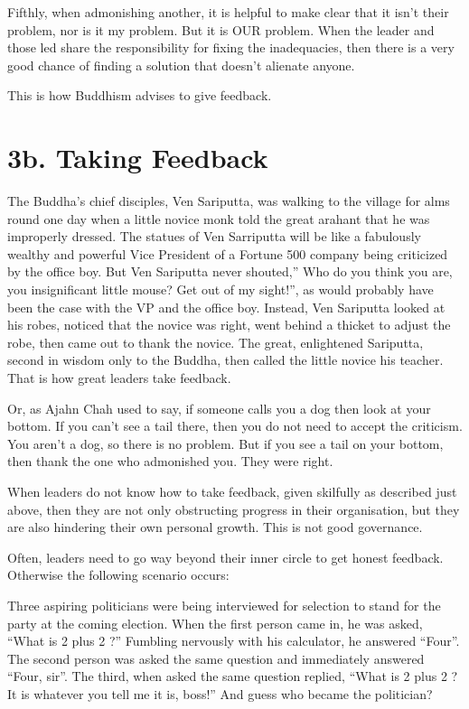\documentclass[12pt, openany]{book}
\begin{document}
Fifthly, when admonishing another, it is helpful to make clear that it isn’t their problem, nor is it my problem. But it is OUR problem. When the leader and those led share the responsibility for fixing the inadequacies, then there is a very good chance of finding a solution that doesn’t alienate anyone.

This is how Buddhism advises to give feedback.

\section{3b. Taking Feedback}

The Buddha’s chief disciples, Ven Sariputta, was walking to the village for alms round one day when a little novice monk told the great arahant that he was improperly dressed. The statues of Ven Sarriputta will be like a fabulously wealthy and powerful Vice President of a Fortune 500 company being criticized by the office boy. But Ven Sariputta never shouted,” Who do you think you are, you insignificant little mouse? Get out of my sight!”, as would probably have been the case with the VP and the office boy. Instead, Ven Sariputta looked at his robes, noticed that the novice was right, went behind a thicket to adjust the robe, then came out to thank the novice. The great, enlightened Sariputta, second in wisdom only to the Buddha, then called the little novice his teacher. That is how great leaders take feedback.

Or, as Ajahn Chah used to say, if someone calls you a dog then look at your bottom. If you can’t see a tail there, then you do not need to accept the criticism. You aren’t a dog, so there is no problem. But if you see a tail on your bottom, then thank the one who admonished you. They were right.

When leaders do not know how to take feedback, given skilfully as described just above, then they are not only obstructing progress in their organisation, but they are also hindering their own personal growth. This is not good governance.

Often, leaders need to go way beyond their inner circle to get honest feedback. Otherwise the following scenario occurs:

Three aspiring politicians were being interviewed for selection to stand for the party at the coming election. When the first person came in, he was asked, “What is 2 plus 2 ?” Fumbling nervously with his calculator, he answered “Four”. The second person was asked the same question and immediately answered “Four, sir”. The third, when asked the same question replied, “What is 2 plus 2 ? It is whatever you tell me it is, boss!” And guess who became the politician?
\end{document}
